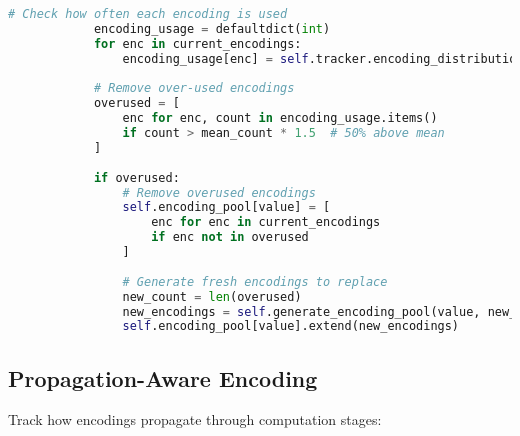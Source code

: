 \begin{lstlisting}[language=Python, caption={Adaptive encoding based on frequency}]
            # Check how often each encoding is used
            encoding_usage = defaultdict(int)
            for enc in current_encodings:
                encoding_usage[enc] = self.tracker.encoding_distribution.get(enc, 0)
            
            # Remove over-used encodings
            overused = [
                enc for enc, count in encoding_usage.items()
                if count > mean_count * 1.5  # 50% above mean
            ]
            
            if overused:
                # Remove overused encodings
                self.encoding_pool[value] = [
                    enc for enc in current_encodings
                    if enc not in overused
                ]
                
                # Generate fresh encodings to replace
                new_count = len(overused)
                new_encodings = self.generate_encoding_pool(value, new_count)
                self.encoding_pool[value].extend(new_encodings)
\end{lstlisting}

\subsection{Propagation-Aware Encoding}

Track how encodings propagate through computation stages:

